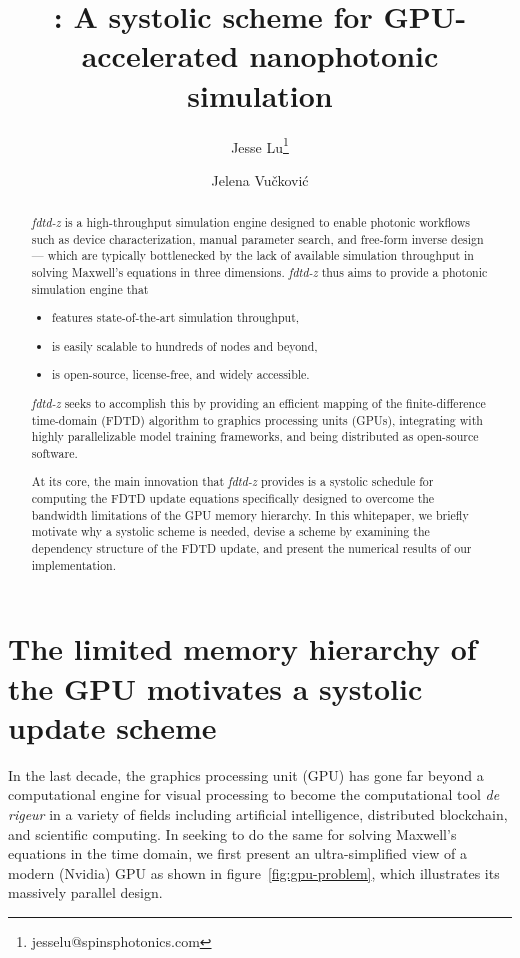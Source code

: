 \documentclass[12pt]{article}
\title{{\fdtdz}: A systolic scheme for GPU-accelerated nanophotonic simulation}
\author{Jesse Lu\thanks{jesselu@spinsphotonics.com} \and Jelena Vu\v ckovi\'c}
\newcommand{\fdtdz}{\mbox{\emph{fdtd-z}}}  %
\begin{document}
\maketitle

\begin{abstract}

% 

{\fdtdz} is a high-throughput simulation engine
  designed to enable photonic workflows such as 
  device characterization,
  manual parameter search, and
  free-form inverse design ---
  which are typically bottlenecked
  by the lack of available simulation throughput
  in solving Maxwell's equations in three dimensions.
{\fdtdz} thus aims to provide a photonic simulation engine that
  \begin{itemize}
    \item features state-of-the-art simulation throughput,
    \item is easily scalable to hundreds of nodes and beyond,
    \item is open-source, license-free, and widely accessible.
  \end{itemize}

{\fdtdz} seeks to accomplish this by
  providing an efficient mapping 
  of the finite-difference time-domain (FDTD) algorithm
  to graphics processing units (GPUs),
  integrating with highly parallelizable model training frameworks,
  and being distributed as open-source software.

At its core,
  the main innovation that {\fdtdz} provides
  is a systolic schedule for computing the FDTD update equations
  specifically designed to overcome the bandwidth limitations
  of the GPU memory hierarchy.
In this whitepaper,
  we briefly motivate why a systolic scheme is needed,
  devise a scheme by examining the dependency structure of the FDTD update, and
  present the numerical results of our implementation.

\end{abstract}

\section{The limited memory hierarchy of the GPU
         motivates a systolic update scheme}
In the last decade,
  the graphics processing unit (GPU)
  has gone far beyond a computational engine for visual processing
  to become the computational tool \emph{de rigeur}
  in a variety of fields including
  artificial intelligence, distributed blockchain, and scientific computing.
In seeking to do the same for solving Maxwell's equations in the time domain,
  we first present an ultra-simplified view of a modern (Nvidia) GPU
  as shown in figure~\ref{fig:gpu-problem},
  which illustrates its massively parallel design.
\end{document}
